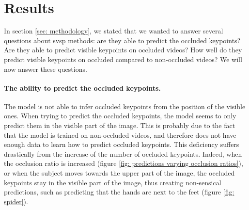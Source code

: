 \documentclass[runningheads]{llncs}
\begin{document}
\section{Results}
In section \ref{sec: methodology}, we stated that we wanted to answer several questions about \ac{svsp} methods: are they able to predict the occluded keypoints? Are they able to predict visible keypoints on occluded videos? How well do they predict visible keypoints on occluded compared to non-occluded videos? We will now answer these questions.
\paragraph{The ability to predict the occluded keypoints.}
The model is not able to infer occluded keypoints from the position of the visible ones. When trying to predict the occluded keypoints, the model seems to only predict them in the visible part of the image. This is probably due to the fact that the model is trained on non-occluded videos, and therefore does not have enough data to learn how to predict occluded keypoints. This deficiency suffers drastically from the increase of the number of occluded keypoints. Indeed, when the occlusion ratio is increased (figure \ref{fig: predictions varying occlusion ratios}), or when the subject moves towards the upper part of the image, the occluded keypoints stay in the visible part of the image, thus creating non-sensical predictions, such as predicting that the hands are next to the feet (figure \ref{fig: spider}).
\end{document}
